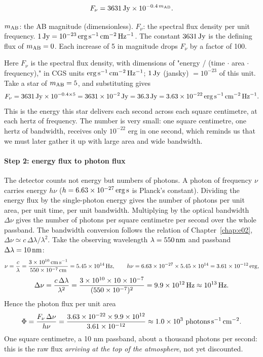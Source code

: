 \begin{equation}
  F_\nu = 3631\,{\rm Jy}\times 10^{-0.4\,m_{\rm AB}}.
  \label{eq:e15-ab-flux}
\end{equation}
\begin{formulaexplain}
$m_{\rm AB}$: the AB magnitude (dimensionless). $F_\nu$: the spectral flux density per unit frequency. $1\,{\rm Jy}=10^{-23}\,{\rm erg\,s^{-1}\,cm^{-2}\,Hz^{-1}}$. The constant $3631\,{\rm Jy}$ is the defining flux of $m_{\rm AB}=0$. Each increase of 5 in magnitude drops $F_\nu$ by a factor of 100.
\end{formulaexplain}

Here $F_\nu$ is the spectral flux density, with dimensions of "energy / (time $\cdot$ area $\cdot$ frequency)," in CGS units ${\rm erg\,s^{-1}\,cm^{-2}\,Hz^{-1}}$; $1\,{\rm Jy}$ (jansky) $=10^{-23}$ of this unit. Take a star of $m_{\rm AB}=5$, and substituting gives
\[
  F_\nu = 3631\,{\rm Jy}\times 10^{-0.4\times5}
        = 3631\times10^{-2}\,{\rm Jy}
        = 36.3\,{\rm Jy}
        = 3.63\times10^{-22}\,{\rm erg\,s^{-1}\,cm^{-2}\,Hz^{-1}} .
\]
This is the energy this star delivers each second across each square centimetre, at each hertz of frequency. The number is very small: one square centimetre, one hertz of bandwidth, receives only $10^{-22}$ erg in one second, which reminds us that we must later gather it up with large area and wide bandwidth.

\paragraph{Step 2: energy flux to photon flux}

The detector counts not energy but numbers of photons. A photon of frequency $\nu$ carries energy $h\nu$ ($h=6.63\times10^{-27}\,{\rm erg\,s}$ is Planck's constant). Dividing the energy flux by the single-photon energy gives the number of photons per unit area, per unit time, per unit bandwidth. Multiplying by the optical bandwidth $\Delta\nu$ gives the number of photons per square centimetre per second over the whole passband. The bandwidth conversion follows the relation of Chapter~\ref{chap:e02}, $\Delta\nu\simeq c\,\Delta\lambda/\lambda^2$. Take the observing wavelength $\lambda=550\,{\rm nm}$ and passband $\Delta\lambda=10\,{\rm nm}$:
\[
  \nu=\frac{c}{\lambda}=\frac{3\times10^{10}\,{\rm cm\,s^{-1}}}{550\times10^{-7}\,{\rm cm}}
     =5.45\times10^{14}\,{\rm Hz},
  \qquad
  h\nu = 6.63\times10^{-27}\times5.45\times10^{14}
       = 3.61\times10^{-12}\,{\rm erg},
\]
\[
  \Delta\nu = \frac{c\,\Delta\lambda}{\lambda^2}
            = \frac{3\times10^{10}\times10\times10^{-7}}{(550\times10^{-7})^2}
            = 9.9\times10^{12}\,{\rm Hz}\approx10^{13}\,{\rm Hz}.
\]
Hence the photon flux per unit area
\[
  \Phi = \frac{F_\nu\,\Delta\nu}{h\nu}
       = \frac{3.63\times10^{-22}\times 9.9\times10^{12}}{3.61\times10^{-12}}
       \approx 1.0\times10^{3}\ {\rm photons\,s^{-1}\,cm^{-2}} .
\]
One square centimetre, a 10 nm passband, about a thousand photons per second: this is the raw flux \emph{arriving at the top of the atmosphere}, not yet discounted.

